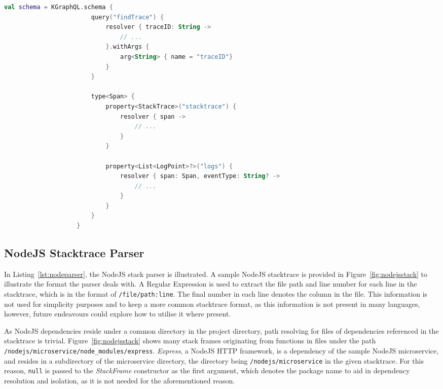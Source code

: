 \documentclass[12pt,pdftex,titlepage]{report}
\begin{document}
            \begin{spacing}{1.0}
                \begin{lstlisting}[caption=Kotlin snippet of defining the GraphQL schema using the Kotlin DSL., language=Kotlin, gobble=20, label={lst:kgraphql}]
                    val schema = KGraphQL.schema { 
                        query("findTrace") { 
                            resolver { traceID: String ->
                                // ...
                            }.withArgs { 
                                arg<String> { name = "traceID"}
                            }
                        }

                        type<Span> {
                            property<StackTrace>("stacktrace") { 
                                resolver { span ->
                                    // ...
                                }
                            }

                            property<List<LogPoint>?>("logs") {
                                resolver { span: Span, eventType: String? ->
                                    // ...
                                }
                            }
                        }
                    }                
                \end{lstlisting}
            \end{spacing}

            \subsection{NodeJS Stacktrace Parser}
            \label{sec:nodeparser}
                In Listing~\ref{lst:nodeparser}, the NodeJS stack parser is illustrated. A sample NodeJS stacktrace is provided in Figure~\ref{fig:nodejsstack} to illustrate the
                format the parser deals with. A Regular Expression is used to extract the file path and line number for each line
                in the stacktrace, which is in the format of \texttt{/file/path:line}. The final number in each line denotes the column in the file. This information is not 
                used for simplicity purposes and to keep a more common stacktrace format, as this information is not present in many languages, however, future endeavours could
                explore how to utilise it where present.
                
                As NodeJS dependencies reside under a common directory in the project directory, path resolving for files of dependencies referenced in the stacktrace is trivial. 
                Figure~\ref{fig:nodejsstack} shows many stack frames originating from functions in files under the path \texttt{/nodejs/microservice/node\_modules/express}. \textit{Express},
                a NodeJS HTTP framework, is a dependency of the sample NodeJS microservice, and resides in a subdirectory of the microservice directory, the directory being \texttt{/nodejs/microservice}
                in the given stacktrace. For this reason, \texttt{null} is passed to the \textit{StackFrame} constructor as the first argument, which denotes the package name to aid in
                dependency resolution and isolation, as it is not needed for the aforementioned reason.
\end{document}
